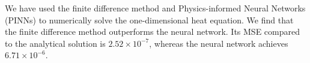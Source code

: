 
We have used the finite difference method and Physics-informed Neural Networks (PINNs) to numerically solve the one-dimensional heat equation. 
We find that the finite difference method outperforms the neural network. 
Its MSE compared to the analytical solution is $2.52 \times 10^{-7}$, whereas the neural network achieves $ 6.71 \times 10^{-6}$. 



